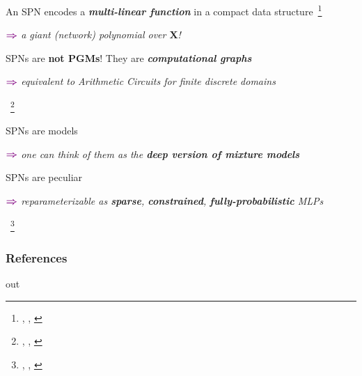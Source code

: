 \documentclass[xcolor={usenames,dvipsnames,svgnames}, compress, aspectratio=169, 11pt]{beamer}
\newcommand{\customcite}[1]{\footnote{\tiny \citeauthor{#1},
    \citetitle{#1}, \citeyear{#1}}}
\begin{document}
\begin{frame}[t]
\frametitle{}

An SPN encodes a \emph{\textbf{multi-linear function}} in a compact data structure~\customcite{Darwiche2009}
   \begin{minipage}{0.9\linewidth}
      \raggedleft
      $\color{violet}\boldsymbol\Rightarrow$
      \scriptsize
     \emph{a giant (network) polynomial over $\mathbf{X}$!}
   \end{minipage}\par\bigskip


SPNs are \textbf{not PGMs}! They are \emph{\textbf{computational graphs}}
\begin{minipage}{0.9\linewidth}
      \raggedleft
   $\color{violet}\boldsymbol\Rightarrow$
      {\scriptsize
     \emph{equivalent to Arithmetic Circuits for finite discrete domains}}
\end{minipage}~\customcite{Rooshenas2014}\par\bigskip


SPNs are  models 
\begin{minipage}{0.9\linewidth}
      \raggedleft
      $\color{violet}\boldsymbol\Rightarrow$
      {\scriptsize
     \emph{one can think of them as the {\textbf{deep version of mixture models}}}}\par
\end{minipage}\par\bigskip

SPNs are peculiar  
\begin{minipage}{0.9\linewidth}
      \raggedleft
      $\color{violet}\boldsymbol\Rightarrow$
      \scriptsize
     \emph{reparameterizable as \textbf{sparse}, \textbf{constrained}, \textbf{fully-probabilistic} MLPs}
\end{minipage}~\customcite{Vergari2016a}\par\bigskip

\end{frame}

   
 
\begin{frame}[allowframebreaks]
  \frametitle{References}
  \setlength\bibitemsep{8pt}
  \printbibliography
\end{frame}

out
\end{document}
